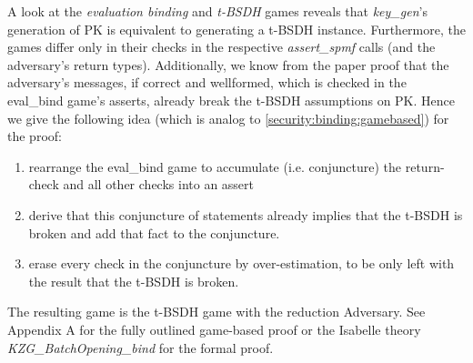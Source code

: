A look at the \textit{evaluation binding} and \textit{t-BSDH} games reveals that \textit{key\_gen}'s generation of PK is equivalent to generating a t-BSDH instance. Furthermore, the games differ only in their checks in the respective \textit{assert\_spmf} calls (and the adversary's return types).  
Additionally, we know from the paper proof that the adversary's messages, if correct and wellformed, which is checked in the eval\_bind game's asserts, already break the t-BSDH assumptions on PK. 
Hence we give the following idea (which is analog to \ref{security:binding:gamebased}) for the proof:
\begin{enumerate}
    \item rearrange the eval\_bind game to accumulate (i.e. conjuncture) the return-check and all other checks into an assert
    \item derive that this conjuncture of statements already implies that the t-BSDH is broken and add that fact to the conjuncture.
    \item erase every check in the conjuncture by over-estimation, to be only left with the result that the t-BSDH is broken.
\end{enumerate}
The resulting game is the t-BSDH game with the reduction Adversary. 
See Appendix A for the fully outlined game-based proof or the Isabelle theory \textit{KZG\_BatchOpening\_bind} for the formal proof.



